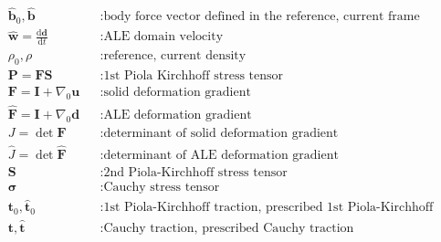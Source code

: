 \documentclass[a4paper,12pt]{report}
\newcommand{\bs}[1]{\boldsymbol{#1}}
\begin{document}
\begin{equation}
\begin{aligned}
&\hat{\bs{b}}_0, \hat{\bs{b}} &&: \text{body force vector defined in the reference, current frame} \\
&\widehat{\bs{w}}=\frac{\mathrm{d}\bs{d}}{\mathrm{d}t} &&: \text{ALE domain velocity} \\
&\rho_0, \rho &&: \text{reference, current density} \\
&\bs{P}=\bs{F}\bs{S} &&: \text{1st Piola Kirchhoff stress tensor} \\
&\bs{F}=\bs{I}+\nabla_{0}\bs{u} &&: \text{solid deformation gradient} \\
&\widehat{\bs{F}}=\bs{I}+\nabla_{0}\bs{d} &&: \text{ALE deformation gradient} \\
&J=\det \bs{F} &&: \text{determinant of solid deformation gradient} \\
&\widehat{J}=\det \widehat{\bs{F}} &&: \text{determinant of ALE deformation gradient} \\
&\bs{S} &&: \text{2nd Piola-Kirchhoff stress tensor} \\
&\bs{\sigma} &&: \text{Cauchy stress tensor} \\
&\bs{t}_0, \hat{\bs{t}}_{0} &&: \text{1st Piola-Kirchhoff traction, prescribed 1st Piola-Kirchhoff traction} \\
&\bs{t}, \hat{\bs{t}} &&: \text{Cauchy traction, prescribed Cauchy traction} \\
\end{aligned}
\end{equation}

\newpage

\end{document}
